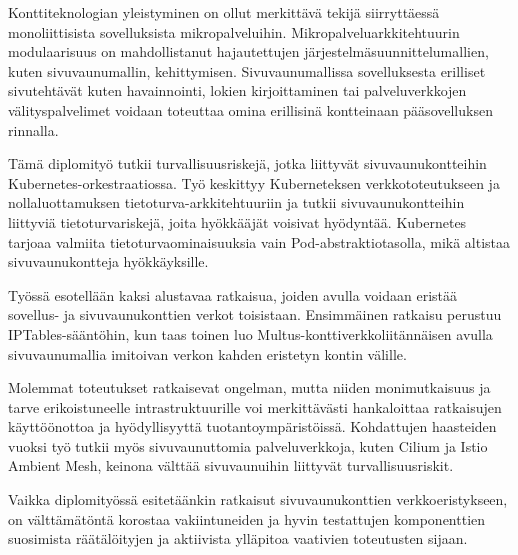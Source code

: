 \documentclass[english, 12pt, a4paper, sci, utf8, a-2b, online]{aaltothesis}
\begin{document}
\newpage

\date{29.12.2023}


\begin{abstractpage}[finnish]
  Konttiteknologian yleistyminen on ollut merkittävä tekijä siirryttäessä monoliittisista sovelluksista mikropalveluihin.
  Mikropalveluarkkitehtuurin modulaarisuus on mahdollistanut hajautettujen järjestelmäsuunnittelumallien, kuten sivuvaunumallin, kehittymisen.
  Sivuvaunumallissa sovelluksesta erilliset sivutehtävät kuten havainnointi, lokien kirjoittaminen tai palveluverkkojen välityspalvelimet voidaan toteuttaa omina erillisinä kontteinaan pääsovelluksen rinnalla.

  Tämä diplomityö tutkii turvallisuusriskejä, jotka liittyvät sivuvaunukontteihin Kubernetes-orkestraatiossa.
  Työ keskittyy Kuberneteksen verkkototeutukseen ja nollaluottamuksen tietoturva-arkkitehtuuriin ja tutkii sivuvaunukontteihin liittyviä tietoturvariskejä, joita hyökkääjät voisivat hyödyntää.
  Kubernetes tarjoaa valmiita tietoturvaominaisuuksia vain Pod-abstraktiotasolla, mikä altistaa sivuvaunukontteja hyökkäyksille.

  Työssä esotellään kaksi alustavaa ratkaisua, joiden avulla voidaan eristää sovellus- ja sivuvaunukonttien verkot toisistaan.
  Ensimmäinen ratkaisu perustuu IPTables-sääntöhin, kun taas toinen luo Multus-konttiverkkoliitännäisen avulla sivuvaunumallia imitoivan verkon kahden eristetyn kontin välille.

  Molemmat toteutukset ratkaisevat ongelman, mutta niiden monimutkaisuus ja tarve erikoistuneelle intrastruktuurille voi merkittävästi hankaloittaa ratkaisujen käyttöönottoa ja hyödyllisyyttä tuotantoympäristöissä.
  Kohdattujen haasteiden vuoksi työ tutkii myös sivuvaunuttomia palveluverkkoja, kuten Cilium ja Istio Ambient Mesh, keinona välttää sivuvaunuihin liittyvät turvallisuusriskit.

  Vaikka diplomityössä esitetäänkin ratkaisut sivuvaunukonttien verkkoeristykseen, on välttämätöntä korostaa vakiintuneiden ja hyvin testattujen komponenttien suosimista räätälöityjen ja aktiivista ylläpitoa vaativien toteutusten sijaan.
\end{abstractpage}
\end{document}
